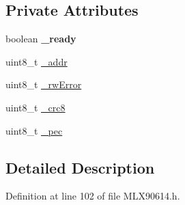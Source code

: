 \subsection*{Private Attributes}
\begin{DoxyCompactItemize}
\item 
\hypertarget{class_m_l_x90614_abcc1f76b9f1c99ae25e365736616679a}{boolean {\bfseries \-\_\-ready}}\label{class_m_l_x90614_abcc1f76b9f1c99ae25e365736616679a}

\item 
uint8\-\_\-t \hyperlink{class_m_l_x90614_a768925264f76f33f9bf98aec1cbec6a9}{\-\_\-addr}
\item 
uint8\-\_\-t \hyperlink{class_m_l_x90614_a8c203cc9359c283d07682ba7dbcc5de3}{\-\_\-rw\-Error}
\item 
uint8\-\_\-t \hyperlink{class_m_l_x90614_add210d34992507e8ccb753a040b14395}{\-\_\-crc8}
\item 
uint8\-\_\-t \hyperlink{class_m_l_x90614_a2526978eb988a8712baee6dca596be15}{\-\_\-pec}
\end{DoxyCompactItemize}


\subsection{Detailed Description}


Definition at line 102 of file M\-L\-X90614.\-h.



